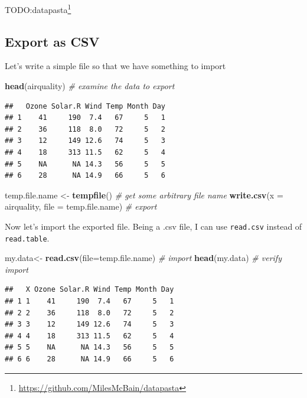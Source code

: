 \documentclass[]{book}
\newenvironment{Shaded}{\begin{snugshade}}{\end{snugshade}}
\newcommand{\CommentTok}[1]{\textcolor[rgb]{0.56,0.35,0.01}{\textit{#1}}}
\newcommand{\DataTypeTok}[1]{\textcolor[rgb]{0.13,0.29,0.53}{#1}}
\newcommand{\KeywordTok}[1]{\textcolor[rgb]{0.13,0.29,0.53}{\textbf{#1}}}
\newcommand{\NormalTok}[1]{#1}
\newcommand{\StringTok}[1]{\textcolor[rgb]{0.31,0.60,0.02}{#1}}
\renewcommand{\href}[2]{#2\footnote{\url{#1}}}
\theoremstyle{definition}
\theoremstyle{definition}
\theoremstyle{definition}
\theoremstyle{remark}
\begin{document}
TODO:\href{https://github.com/MilesMcBain/datapasta}{datapasta}

\hypertarget{export-as-csv}{%
\subsection{Export as CSV}\label{export-as-csv}}

Let's write a simple file so that we have something to import

\begin{Shaded}
\begin{Highlighting}[]
\KeywordTok{head}\NormalTok{(airquality) }\CommentTok{#  examine the data to export}
\end{Highlighting}
\end{Shaded}

\begin{verbatim}
##   Ozone Solar.R Wind Temp Month Day
## 1    41     190  7.4   67     5   1
## 2    36     118  8.0   72     5   2
## 3    12     149 12.6   74     5   3
## 4    18     313 11.5   62     5   4
## 5    NA      NA 14.3   56     5   5
## 6    28      NA 14.9   66     5   6
\end{verbatim}

\begin{Shaded}
\begin{Highlighting}[]
\NormalTok{temp.file.name <-}\StringTok{ }\KeywordTok{tempfile}\NormalTok{() }\CommentTok{# get some arbitrary file name}
\KeywordTok{write.csv}\NormalTok{(}\DataTypeTok{x =}\NormalTok{ airquality, }\DataTypeTok{file =}\NormalTok{ temp.file.name) }\CommentTok{# export}
\end{Highlighting}
\end{Shaded}

Now let's import the exported file. Being a .csv file, I can use \texttt{read.csv} instead of \texttt{read.table}.

\begin{Shaded}
\begin{Highlighting}[]
\NormalTok{my.data<-}\StringTok{ }\KeywordTok{read.csv}\NormalTok{(}\DataTypeTok{file=}\NormalTok{temp.file.name) }\CommentTok{# import}
\KeywordTok{head}\NormalTok{(my.data) }\CommentTok{# verify import}
\end{Highlighting}
\end{Shaded}

\begin{verbatim}
##   X Ozone Solar.R Wind Temp Month Day
## 1 1    41     190  7.4   67     5   1
## 2 2    36     118  8.0   72     5   2
## 3 3    12     149 12.6   74     5   3
## 4 4    18     313 11.5   62     5   4
## 5 5    NA      NA 14.3   56     5   5
## 6 6    28      NA 14.9   66     5   6
\end{verbatim}
\end{document}
